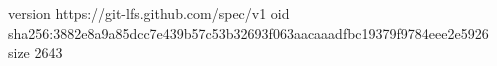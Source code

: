 version https://git-lfs.github.com/spec/v1
oid sha256:3882e8a9a85dcc7e439b57c53b32693f063aacaaadfbc19379f9784eee2e5926
size 2643
